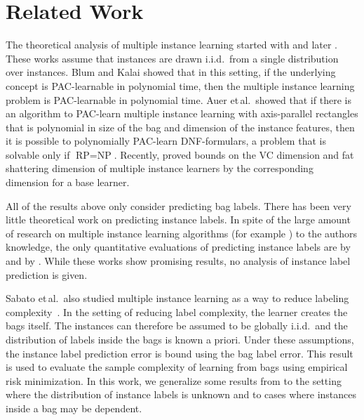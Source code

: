 \section{Related Work}
The theoretical analysis of multiple instance learning started with \citet{auer1997approximating} and later \citet{blum1998note}.
These works assume that instances are drawn i.i.d.\ from a single distribution over instances. Blum and Kalai showed that in this
setting, if the underlying concept is PAC-learnable in polynomial time, then the multiple instance learning problem is PAC-learnable
in polynomial time. Auer et\,al.\ showed that if there is an algorithm to PAC-learn multiple instance learning with axis-parallel
rectangles that is polynomial in size of the bag and dimension of the instance features, then it is possible to polynomially
PAC-learn DNF-formulars, a problem that is solvable only if $\text{RP}=\text{NP}$.
Recently, \citet{sabato2009homogeneous,DBLP:journals/corr/abs-1107-2021} proved bounds on the VC dimension and
fat shattering dimension of multiple instance learners by the corresponding dimension for a base learner.

All of the results above only consider predicting bag labels. There has been very little theoretical work
on predicting instance labels. In spite of the large amount of research on multiple instance learning algorithms 
(for example \citet{andrews2003support,gaertner2002multi,zhou2009multi,li2009convex,zhang2002dd,mangasarian2008multiple,leistner2010miforests,chen2006miles})
to the authors knowledge, the only quantitative evaluations of predicting
instance labels are by \citet{gehler2007deterministic} and by \citet{liconvex2010}. While these works show promising results,
no analysis of instance label prediction is given.

Sabato et\,al.\ also studied multiple instance learning as a way
to reduce labeling complexity~\citep{sabato2010reducing}.
In the setting of reducing label complexity, the learner creates
the bags itself. The instances can therefore be assumed to be globally i.i.d.\ and
the distribution of labels inside the bags is known a priori.
Under these assumptions, the instance label prediction error is bound using the bag label error.
This result is used to evaluate the sample complexity of learning from bags using empirical risk minimization.
In this work, we generalize some results from \citet{sabato2010reducing} to the setting where the distribution
of instance labels is unknown and to cases where instances inside a bag may be dependent.

